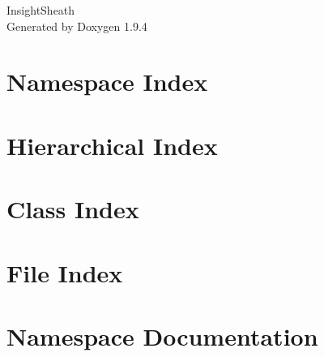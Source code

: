 \documentclass[twoside]{book}
\newcommand{\+}{\discretionary{\mbox{\scriptsize$\hookleftarrow$}}{}{}}
\newcommand{\clearemptydoublepage}{%
    \newpage{\pagestyle{empty}\cleardoublepage}%
  }
\begin{document}
  \raggedbottom
    \hypersetup{pageanchor=false,
                bookmarksnumbered=true,
                pdfencoding=unicode
               }
  \begin{titlepage}
  \vspace*{7cm}
  \begin{center}%
  {\Large Insight\+Sheath}\\
  \vspace*{1cm}
  {\large Generated by Doxygen 1.9.4}\\
  \end{center}
  \end{titlepage}
  \clearemptydoublepage
  \tableofcontents
  \clearemptydoublepage
  \hypersetup{pageanchor=true}
\chapter{Namespace Index}

\chapter{Hierarchical Index}

\chapter{Class Index}

\chapter{File Index}

\chapter{Namespace Documentation}












\end{document}
